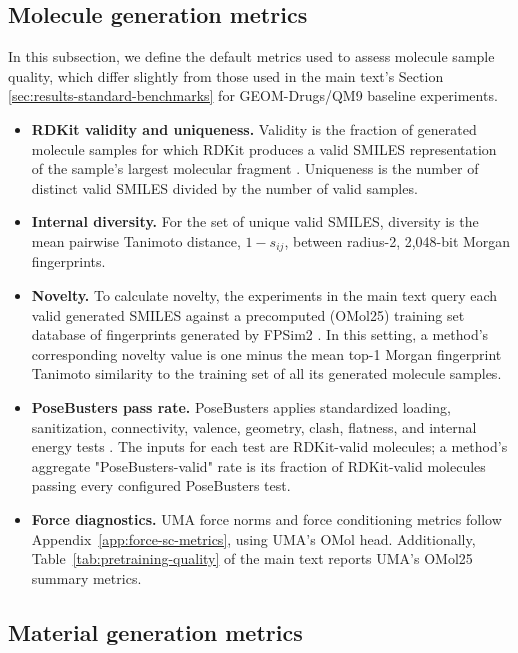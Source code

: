 \documentclass{article} %
\begin{document}
\subsection{Molecule generation metrics}
\label{app:metrics-molecule-generation}

In this subsection, we define the default metrics used to assess molecule sample quality, which differ slightly from those used in the main text's Section \ref{sec:results-standard-benchmarks} for GEOM-Drugs/QM9 baseline experiments.

\begin{itemize}
  \item \textbf{RDKit validity and uniqueness.} Validity is the fraction of
  generated molecule samples for which RDKit produces a valid SMILES representation of the sample's largest molecular fragment \citep{landrum2013rdkit}. Uniqueness
  is the number of distinct valid SMILES divided by the number of valid
  samples.
  \item \textbf{Internal diversity.} For the set of unique valid SMILES,
  diversity is the mean pairwise Tanimoto distance, $1-s_{ij}$, between
  radius-2, 2,048-bit Morgan fingerprints.
  \item \textbf{Novelty.} To calculate novelty, the experiments in the main text query each valid generated SMILES against a precomputed (OMol25) training set database of fingerprints generated by FPSim2 \citep{eloy_felix_2025_14652272}. In this setting, a method's corresponding novelty value is one minus the mean top-1 Morgan fingerprint Tanimoto similarity to the training set of all its generated molecule samples.
  \item \textbf{PoseBusters pass rate.} PoseBusters applies standardized
  loading, sanitization, connectivity, valence, geometry, clash, flatness, and
  internal energy tests \citep{buttenschoen2024posebusters}. The inputs for each test are RDKit-valid molecules; a method's aggregate "PoseBusters-valid" rate is its fraction of RDKit-valid molecules passing every configured PoseBusters test.
  \item \textbf{Force diagnostics.} UMA force norms and force conditioning
  metrics follow Appendix~\ref{app:force-sc-metrics}, using UMA's OMol head. Additionally, Table~\ref{tab:pretraining-quality} of the main text reports UMA's OMol25 summary metrics.
\end{itemize}

\subsection{Material generation metrics}
\label{app:metrics-material-generation}
\end{document}

